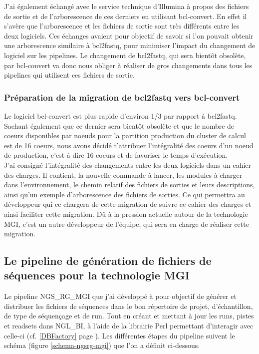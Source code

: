 J'ai également échangé avec le service technique d'Illumina à propos des fichiers de sortie et de l'arborescence de ces derniers en utilisant bcl-convert. En effet il s'avère que l'arborescence et les fichiers de sortie sont très différents entre les deux logiciels. Ces échanges avaient pour objectif de savoir si l'on pouvait obtenir une arborescence similaire à bcl2fastq, pour minimiser l'impact du changement de logiciel sur les pipelines. Le changement de bcl2fastq, qui sera bientôt obsolète, par bcl-convert va donc nous obliger à réaliser de gros changements dans tous les pipelines qui utilisent ces fichiers de sortie.

\subsubsection*{Préparation de la migration de bcl2fastq vers bcl-convert}
Le logiciel bcl-convert est plus rapide d'environ 1/3 par rapport à bcl2fastq. Sachant également que ce dernier sera bientôt obsolète et que le nombre de coeurs disponibles par noeuds pour la partition \og production\fg{} du cluster de calcul est de 16 coeurs, nous avons décidé t'attribuer l'intégralité des coeurs d'un noeud de \og production\fg{}, c'est à dire 16 coeurs et de favoriser le temps d'exécution.\\

J'ai consigné l'intégralité des changements entre les deux logiciels dans un cahier des charges. Il contient, la nouvelle commande à lancer, les modules à charger dans l'environnement, le chemin relatif des fichiers de sorties et leurs descriptions, ainsi qu'un exemple d'arborescence des fichiers de sorties. Ce qui permettra au développeur qui ce chargera de cette migration de suivre ce cahier des charges et ainsi faciliter cette migration. Dû à la pression actuelle autour de la technologie MGI, c'est un autre développeur de l'équipe, qui sera en charge de réaliser cette migration.


\subsection{Le pipeline de génération de fichiers de séquences pour la technologie MGI}
Le pipeline NGS\_RG\_MGI que j'ai développé à pour objectif de générer et distribuer les fichiers de séquences dans le bon répertoire de projet, d'échantillon, de type de séquençage et de run.
Tout en créant et mettant à jour les runs, pistes et readsets dans NGL\_BI, à l'aide de la librairie Perl permettant d'interagir avec celle-ci (cf. \ref{DBFactory} page \pageref{DBFactory}). Les différentes étapes du pipeline suivent le schéma (figure \ref{schema-ngsrg-mgi}) que l'on a définit ci-dessous.

